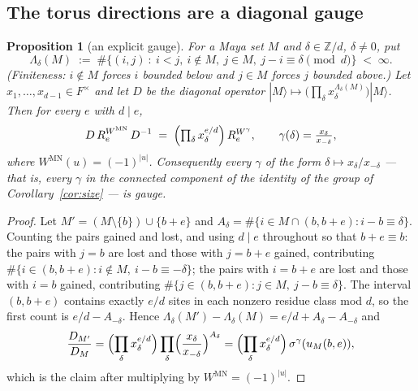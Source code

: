 \documentclass[11pt]{article}
\newtheorem{proposition}[theorem]{Proposition}
\theoremstyle{definition}
\theoremstyle{remark}
\newcommand{\Z}{\mathbb{Z}}
\begin{document}
\subsection{The torus directions are a diagonal gauge}

\begin{proposition}[an explicit gauge]\label{prop:gauge}
For a Maya set $M$ and $\delta\in\Z/d$, $\delta\ne0$, put
\[
   \Lambda_\delta(M)\;:=\;\#\bigl\{(i,j)\ :\ i<j,\ i\notin M,\ j\in M,\
     j-i\equiv\delta \!\!\pmod d\bigr\}\;<\;\infty .
\]
(Finiteness: $i\notin M$ forces $i$ bounded below and $j\in M$ forces $j$ bounded above.)
Let $x_1,\dots,x_{d-1}\in F^{\times}$ and let $D$ be the diagonal operator
$|M\rangle\mapsto\bigl(\prod_{\delta}x_\delta^{\Lambda_\delta(M)}\bigr)|M\rangle$.  Then
for every $e$ with $d\mid e$,
\[
   D\,R_e^{W^{\mathrm{MN}}}\,D^{-1}\;=\;\Bigl(\textstyle\prod_\delta x_\delta^{e/d}\Bigr)\,
      R_e^{W^{\gamma}},\qquad
   \gamma(\delta)=\frac{x_\delta}{x_{-\delta}} ,
\]
where $W^{\mathrm{MN}}(u)=(-1)^{|u|}$.  Consequently every $\gamma$ of the form
$\delta\mapsto x_\delta/x_{-\delta}$ --- that is, every $\gamma$ in the connected
component of the identity of the group of Corollary~\ref{cor:size} --- is gauge.
\end{proposition}

\begin{proof}
Let $M'=(M\setminus\{b\})\cup\{b+e\}$ and $A_\delta=\#\{i\in M\cap(b,b+e):i-b\equiv\delta\}$.
Counting the pairs gained and lost, and using $d\mid e$ throughout so that
$b+e\equiv b$:
the pairs with $j=b$ are lost and those with $j=b+e$ gained, contributing
$\#\{i\in(b,b+e): i\notin M,\ i-b\equiv-\delta\}$; the pairs with $i=b+e$ are lost and
those with $i=b$ gained, contributing $\#\{j\in(b,b+e): j\in M,\ j-b\equiv\delta\}$.
The interval $(b,b+e)$ contains exactly $e/d$ sites in each nonzero residue class
mod $d$, so the first count is $e/d-A_{-\delta}$.  Hence
$\Lambda_\delta(M')-\Lambda_\delta(M)=e/d+A_\delta-A_{-\delta}$ and
\[
   \frac{D_{M'}}{D_M}=\Bigl(\prod_\delta x_\delta^{e/d}\Bigr)\prod_\delta
     \Bigl(\frac{x_\delta}{x_{-\delta}}\Bigr)^{A_\delta}
   =\Bigl(\prod_\delta x_\delta^{e/d}\Bigr)\,\sigma^{\gamma}(u_M(b,e)),
\]
which is the claim after multiplying by $W^{\mathrm{MN}}=(-1)^{|u|}$.
\end{proof}
\end{document}
